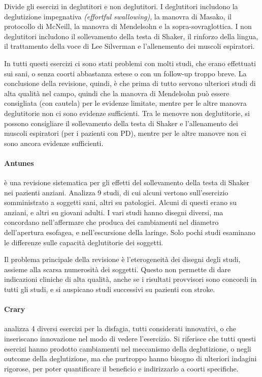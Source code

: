Divide gli esercizi in deglutitori e non deglutitori.
I deglutitori includono la deglutizione impegnativa \textit{(effortful 
swallowing)}, la manovra di Masako, il protocollo di McNeill, la manovra di 
Mendelsohn e la sopra-sovraglottica.
I non deglutitori includono il sollevamento della testa di Shaker, il rinforzo 
della lingua, il trattamento della voce di Lee Silverman e l'allenemento dei 
muscoli espiratori.

In tutti questi esercizi ci sono stati problemi con molti studi, che erano 
effettuati sui sani, o senza coorti abbastanza estese o con un follow-up troppo 
breve.
La conclusione della revisione, quindi, è che prima di tutto servono ulteriori 
studi di alta qualità nel campo, quindi che la manovra di Mendelsohn può essere 
consigliata (con cautela) per le evidenze limitate, mentre per le altre manovra 
deglutitorie non ci sono evidenze sufficienti.
Tra le menovre non deglutitorie, si possono consigliare il sollevamento della 
testa di Shaker e l'allenamento dei muscoli espiratori (per i pazienti con PD), 
mentre per le altre manovre non ci sono ancora evidenze sufficienti.

\paragraph{Antunes} \cite{Antunes2012} è una revisione sistematica per gli 
effetti del sollevamento della testa di Shaker nei pazienti anziani.
Analizza 9 studi, di cui alcuni vertono sull'esercizio somministrato a soggetti 
sani, altri su patologici.
Alcuni di questi erano su anziani, e altri su giovani adulti.
I vari studi hanno disegni diversi, ma concordano nell'affermare che produca 
dei cambiamenti nel diametro dell'apertura esofagea, e nell'escursione della 
laringe.
Solo pochi studi esaminano le differenze sulle capacità deglutitorie dei 
soggetti.

Il problema principale della revisione è l'eterogeneità dei disegni degli 
studi, assieme alla scarsa numerosità dei soggetti.
Questo non permette di dare indicazioni cliniche di alta qualità, anche se i 
risultati provvisori sono concordi in tutti gli studi, e si auspicano studi 
successivi su pazienti con stroke.

\paragraph{Crary}\label{par:cra} \cite{Crary2014} analizza 4 diversi esercizi 
per la disfagia, tutti considerati innovativi, o che inseriscano innovazione 
nel modo di vedere l'esercizio.
Si riferisce che tutti questi esercizi hanno prodotto cambiamenti nel 
meccanismo della deglutizione, o negli outcome della deglutizione, ma che 
purtroppo hanno bisogno di ulteriori indagini rigorose, per poter quantificare 
il beneficio e indirizzarlo a coorti specifiche.

